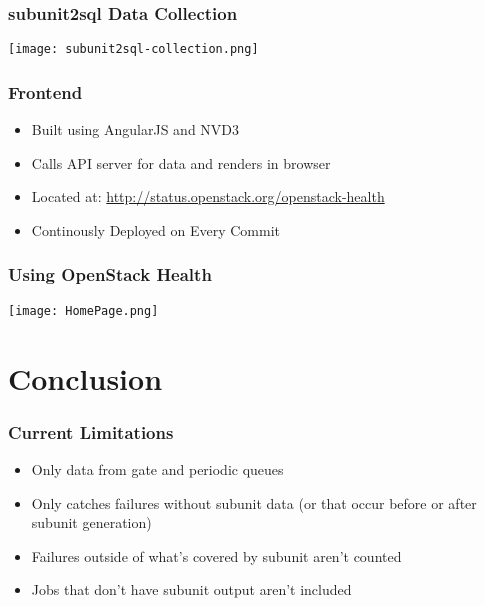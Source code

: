 \documentclass[aspectratio=169,11pt,hyperref={colorlinks=true}]{beamer}
\begin{document}
\begin{frame}
    \frametitle{subunit2sql Data Collection}
    \begin{center}
        \texttt{[image: subunit2sql-collection.png]}
    \end{center}
\end{frame}

\begin{frame}
    \frametitle{Frontend}
    \begin{itemize}
        \item Built using AngularJS and NVD3
        \item Calls API server for data and renders in browser
        \item Located at: \href{http://status.openstack.org/openstack-health}{http://status.openstack.org/openstack-health}
        \item Continously Deployed on Every Commit
    \end{itemize}
\end{frame}

\begin{frame}
	\frametitle{Using OpenStack Health}
    \begin{center}
        \texttt{[image: HomePage.png]}
    \end{center}
\end{frame}

\section{Conclusion}

\begin{frame}
    \frametitle{Current Limitations}
    \begin{itemize}
        \item Only data from gate and periodic queues
        \item Only catches failures without subunit data (or that occur before or after subunit generation)
        \item Failures outside of what's covered by subunit aren't counted
        \item Jobs that don't have subunit output aren't included
    \end{itemize}
\end{frame}
\end{document}
